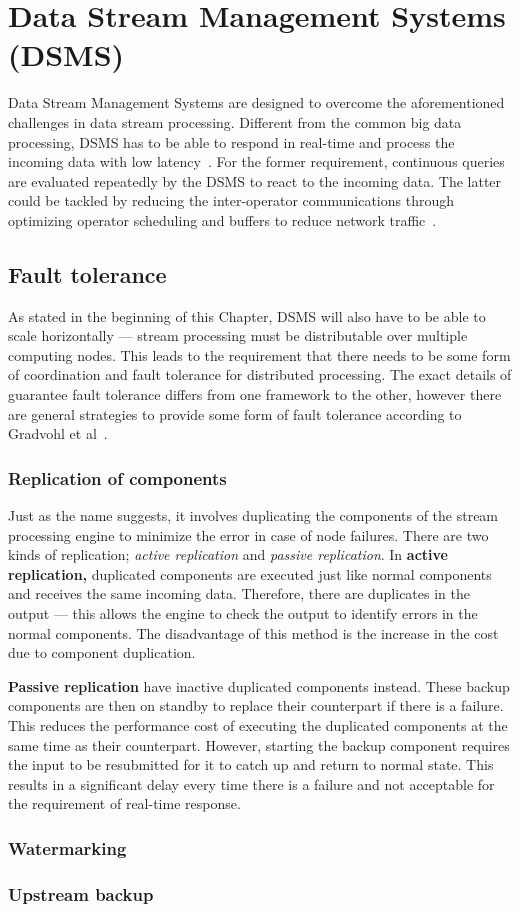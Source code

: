 \section{Data Stream Management Systems (DSMS)} 
Data Stream Management Systems are designed to overcome the aforementioned challenges 
in data stream processing. Different from the common big data processing, DSMS has to be 
able to respond in real-time and process the incoming data with low latency~\cite{data_stream_management}. 
For the former requirement, continuous queries are evaluated repeatedly by the DSMS to react 
to the incoming data. The latter could be tackled by reducing the inter-operator communications 
through optimizing operator scheduling and buffers to reduce network traffic~\cite{low_latency_data_stream}. 



\subsection{Fault tolerance}
As stated in the beginning of this Chapter, DSMS will also have to be able to scale 
horizontally --- stream processing must be distributable over multiple computing nodes. 
This leads to the requirement that there needs to be some form of coordination and fault tolerance 
for distributed processing. The exact details of guarantee fault tolerance differs from 
one framework to the other, however there are general strategies to provide some 
form of fault tolerance according to Gradvohl et al~\cite{fault_tolerance_dsms}.

\subsubsection{Replication of components}
Just as the name suggests, it involves duplicating the components of the stream processing
engine to minimize the error in case of node failures. There are two kinds of replication; 
\emph{active replication} and \emph{passive replication}. In \textbf{active replication,}
duplicated components are executed just like normal components and receives the same incoming data. 
Therefore, there are duplicates in the output --- this allows the engine to check the 
output to identify errors in the normal components. The disadvantage of this method is 
the increase in the cost due to component duplication. 

\textbf{Passive replication} have inactive duplicated components instead. These backup
components are then on standby to replace their counterpart if there is a failure. This 
reduces the performance cost of executing the duplicated components at the same 
time as their counterpart. However, starting the backup component requires the input 
to be resubmitted for it to catch up and return to normal state. This results in a significant 
delay every time there is a failure and not acceptable for the requirement of real-time response. 


\subsubsection{Watermarking}


\subsubsection{Upstream backup}
